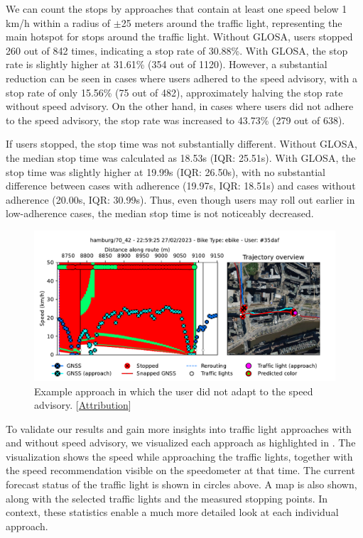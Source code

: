 We can count the stops by approaches that contain at least one speed below 1 km/h within a radius of $\pm$25 meters around the traffic light, representing the main hotspot for stops around the traffic light. Without GLOSA, users stopped 260 out of 842 times, indicating a stop rate of 30.88\%. With GLOSA, the stop rate is slightly higher at 31.61\% (354 out of 1120). However, a substantial reduction can be seen in cases where users adhered to the speed advisory, with a stop rate of only 15.56\% (75 out of 482), approximately halving the stop rate without speed advisory. On the other hand, in cases where users did not adhere to the speed advisory, the stop rate was increased to 43.73\% (279 out of 638).

If users stopped, the stop time was not substantially different. Without GLOSA, the median stop time was calculated as 18.53s (IQR: 25.51s). With GLOSA, the stop time was slightly higher at 19.99s (IQR: 26.50s), with no substantial difference between cases with adherence (19.97s, IQR: 18.51s) and cases without adherence (20.00s, IQR: 30.99s). Thus, even though users may roll out earlier in low-adherence cases, the median stop time is not noticeably decreased.

\begin{figure}[t]
\caption{Example approach in which the user did not adapt to the speed advisory. [\hyperref[attribution]{Attribution}]}\label{fig:example-trajectory-not-adapted}
\includegraphics[width=\linewidth]{images/example-trajectory-not-adapted.pdf}
\end{figure}

To validate our results and gain more insights into traffic light approaches with and without speed advisory, we visualized each approach as highlighted in . The visualization shows the speed while approaching the traffic lights, together with the speed recommendation visible on the speedometer at that time. The current forecast status of the traffic light is shown in circles above. A map is also shown, along with the selected traffic lights and the measured stopping points. In context, these statistics enable a much more detailed look at each individual approach.

